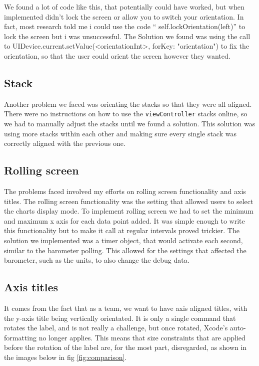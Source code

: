 \documentclass[onecolumn, draftclsnofoot,10pt, compsoc]{IEEEtran}
\begin{document}
   We found a lot of code like this, that potentially could have worked, but when implemented didn't lock the screen or allow you to switch your orientation.
    In fact, most research told me i could use the code “ self.lockOrientation(left)” to lock the screen but i was unsuccessful.
   The Solution we found was using the call to {UIDevice.current.setValue(<orientationInt>, forKey: "orientation")} to fix the orientation, so that the user could orient the screen however they wanted.


\subsection{Stack}
    Another problem we faced was orienting the stacks so that they were all aligned.
    There were no instructions on how to use the \texttt{viewController} stacks online, so we had to manually adjust the stacks until we found a solution.
    This solution was using more stacks within each other and making sure every single stack was correctly aligned with the previous one.

\subsection{Rolling screen }

The problems faced involved my efforts on rolling screen functionality and axis titles.
The rolling screen functionality was the setting that allowed users to select the charts display mode.
To implement rolling screen we had to set the minimum and maximum x axis for each data point added.
It was simple enough to write this functionality but to make it call at regular intervals proved trickier.
The solution we implemented was a timer object, that would activate each second, similar to the barometer polling.
This allowed for the settings that affected the barometer, such as the units, to also change the debug data.

\subsection{Axis titles}
It comes from the fact that as a team, we want to have axis aligned titles, with the y-axis title being vertically orientated.
It is only a single command that rotates the label, and is not really a challenge, but once rotated, Xcode's auto-formatting no longer applies.
This means that size constraints that are applied before the rotation of the label are, for the most part, disregarded, as shown in the images below in fig \ref{fig:comparison}.
\end{document}
